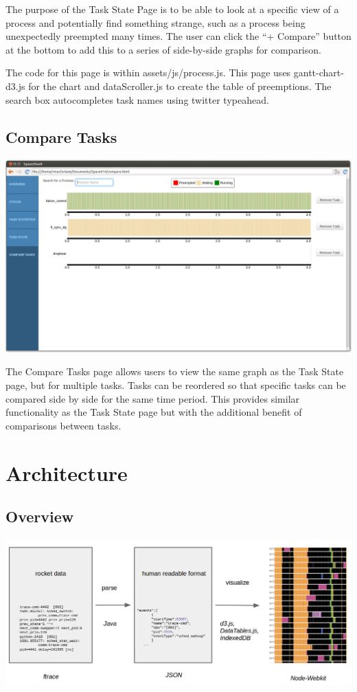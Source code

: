 \documentclass{hmcclinic}
\begin{document}
    The purpose of the Task State Page is to be able to look at a specific view of a
    process and potentially find something strange, such as a process being
    unexpectedly preempted many times. The user can click the ``+ Compare'' button
    at the bottom to add this to a series of side-by-side graphs for comparison.

    The code for this page is within assets/js/process.js. This page uses
    gantt-chart-d3.js for the chart and dataScroller.js to create the table of
    preemptions. The search box autocompletes task names using twitter
    typeahead.
  
  \subsection{Compare Tasks} %

  \includegraphics[scale=0.25]{compare-page.png}
 
The Compare Tasks page allows users to view the same graph as the Task State
page, but for multiple tasks. Tasks can be reordered so that specific tasks can
be compared side by side for the same time period. This provides similar
functionality as the Task State page but with the additional benefit of
comparisons between tasks.

\section{Architecture} %

  \subsection{Overview}

  \includegraphics[scale=0.25]{architecture.png}
\end{document}
